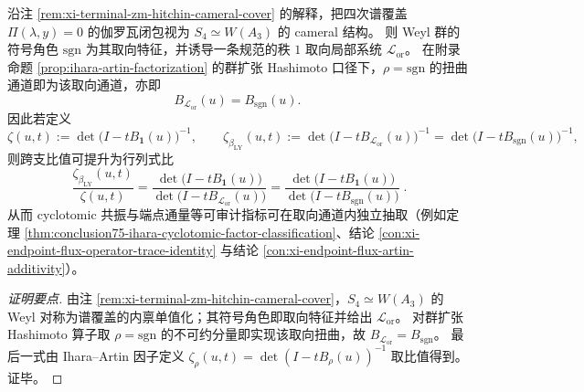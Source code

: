 \begin{conclusion}[Hitchin--cameral 取向通道：\texorpdfstring{$W(A_3)\cong S_4$}{W(A3)=S4} 的符号特征给出 \texorpdfstring{$\beta_{\mathrm{LY}}$}{beta_LY} 与行列式比]\label{con:xi-terminal-zm-hitchin-cameral-orientation-channel}
沿注 \ref{rem:xi-terminal-zm-hitchin-cameral-cover} 的解释，把四次谱覆盖 \(\Pi(\lambda,y)=0\) 的伽罗瓦闭包视为 \(S_4\simeq W(A_3)\) 的 cameral 结构。
则 Weyl 群的符号角色 \(\mathrm{sgn}\) 为其取向特征，并诱导一条规范的秩 \(1\) 取向局部系统 \(\mathcal L_{\mathrm{or}}\)。
在附录命题 \ref{prop:ihara-artin-factorization} 的群扩张 Hashimoto 口径下，\(\rho=\mathrm{sgn}\) 的扭曲通道即为该取向通道，亦即
\[
B_{\mathcal L_{\mathrm{or}}}(u)=B_{\mathrm{sgn}}(u).
\]
因此若定义
\[
\zeta(u,t):=\det\bigl(I-tB_{\mathbf 1}(u)\bigr)^{-1},
\qquad
\zeta_{\beta_{\mathrm{LY}}}(u,t):=\det\bigl(I-tB_{\mathcal L_{\mathrm{or}}}(u)\bigr)^{-1}
=\det\bigl(I-tB_{\mathrm{sgn}}(u)\bigr)^{-1},
\]
则跨支比值可提升为行列式比
\[
\boxed{\;
\frac{\zeta_{\beta_{\mathrm{LY}}}(u,t)}{\zeta(u,t)}
=
\frac{\det\bigl(I-tB_{\mathbf 1}(u)\bigr)}{\det\bigl(I-tB_{\mathcal L_{\mathrm{or}}}(u)\bigr)}
=
\frac{\det\bigl(I-tB_{\mathbf 1}(u)\bigr)}{\det\bigl(I-tB_{\mathrm{sgn}}(u)\bigr)}\; }.
\]
从而 cyclotomic 共振与端点通量等可审计指标可在取向通道内独立抽取（例如定理 \ref{thm:conclusion75-ihara-cyclotomic-factor-classification}、结论 \ref{con:xi-endpoint-flux-operator-trace-identity} 与结论 \ref{con:xi-endpoint-flux-artin-additivity}）。
\end{conclusion}
\begin{proof}[证明要点]
由注 \ref{rem:xi-terminal-zm-hitchin-cameral-cover}，\(S_4\simeq W(A_3)\) 的 Weyl 对称为谱覆盖的内禀单值化；其符号角色即取向特征并给出 \(\mathcal L_{\mathrm{or}}\)。
对群扩张 Hashimoto 算子取 \(\rho=\mathrm{sgn}\) 的不可约分量即实现该取向扭曲，故 \(B_{\mathcal L_{\mathrm{or}}}=B_{\mathrm{sgn}}\)。
最后一式由 Ihara--Artin 因子定义
\(
\zeta_{\rho}(u,t)=\det(I-tB_\rho(u))^{-1}
\)
取比值得到。证毕。
\end{proof}

